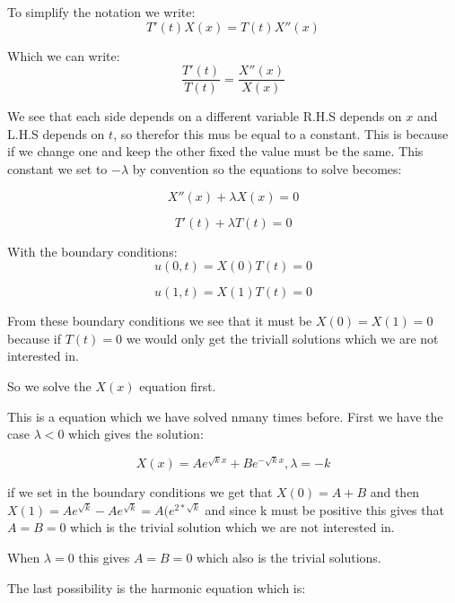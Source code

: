 \documentclass[a4paper,10pt]{article}
\begin{document}
To simplify the notation we write:
\begin{equation}
 T'(t)X(x) = T(t)X''(x)
\end{equation}

Which we can write:
\begin{equation}
 \frac{T'(t)}{T(t)} = \frac{X''(x)}{X(x)}
\end{equation}

We see that each side depends on a different variable R.H.S depends on $x$ and L.H.S depends on $t$, so therefor this mus be equal to a constant.
This is because if we change one and keep the other fixed the value must be the same. This constant we set to $-\lambda$ by convention so the equations
to solve becomes:

\begin{equation}
 X''(x) + \lambda X(x) = 0
\end{equation}

\begin{equation}
 T'(t) + \lambda T(t) = 0
\end{equation}

With the boundary conditions:
\begin{equation}
 u(0,t) = X(0)T(t) = 0
\end{equation}

\begin{equation}
 u(1,t) = X(1)T(t) = 0
\end{equation}

From these boundary conditions we see that it must be $X(0) = X(1) = 0$ because if $T(t)=0$ we would only get the triviall solutions which we are not interested in.

So we solve the $X(x)$ equation first.

This is a equation which we have solved nmany times before. First we have the case $\lambda < 0$ which gives the solution:

\begin{equation}
 X(x) = Ae^{\sqrt{k}x} + Be^{-\sqrt{k}x}, \lambda=-k
\end{equation}

if we set in the boundary conditions we get that $X(0) = A+B$ and then $X(1) = Ae^{\sqrt{k}} - Ae^{\sqrt{k}} = A(e^{2*\sqrt{k}}$ and since k must
be positive this gives that $A=B=0$ which is the trivial solution which we are not interested in.

When $\lambda = 0 $ this gives $A=B=0$ which also is the trivial solutions.

The last possibility is the harmonic equation which is:
\end{document}
